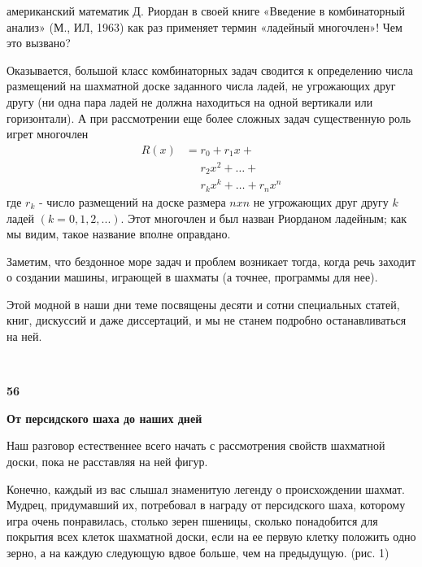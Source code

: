 \begin{multicols}{3}
\RaggedRight
\setlength{\parskip}{0pt}
\setlength{\parindent}{0pt}
американский математик Д. Риордан в своей книге
«Введение в комбинаторный анализ» (М., ИЛ, 1963) как раз 
применяет термин «ладейный многочлен»! Чем это вызвано?

\setlength{\parindent}{17pt} 
Оказывается, большой класс комбинаторных задач сводится к определению
числа размещений на шахматной доске заданного числа ладей,
не угрожающих друг другу (ни одна пара ладей не должна
находиться на одной вертикали или горизонтали). А при
рассмотрении еще более сложных задач существенную роль игрет
многочлен 
{\setlength{\abovedisplayskip}{6pt}
\setlength{\belowdisplayskip}{6pt}
\[
\begin{aligned}
    R(x) &= r_0 + r_1x + \\
         &\phantom{=} r_2x^2 + \dots + \\
         &\phantom{=} r_kx^k + \dots + r_nx^n
\end{aligned}
\]} где \(r_k\) - число размещений на доске размера \(nxn\) не угрожающих друг другу \(k\)
ладей \((k = 0,1,2,...)\). Этот многочлен и был назван Риорданом ладейным; как мы видим,
такое название вполне оправдано.

Заметим, что бездонное море задач и проблем возникает тогда, когда речь заходит о
создании машины, играющей в шахматы (а точнее, программы для нее).

Этой модной в наши дни теме посвящены десяти и сотни специальных статей, книг, дискуссий и даже диссертаций, и мы не станем подробно останавливаться на ней.


\quad \\

\begin{flushleft}
\textbf{56}    
\end{flushleft}


\columnbreak


\begin{center}
  \textbf{От персидского шаха до наших дней}
\end{center} 

Наш разговор естественнее всего начать с рассмотрения свойств шахматной доски,
пока не расставляя на ней фигур.

Конечно, каждый из вас слышал знаменитую легенду о происхождении шахмат. Мудрец, придумавший их, потребовал в награду от персидского шаха, которому игра очень понравилась, столько зерен пшеницы, сколько понадобится для покрытия всех клеток шахматной доски, если на ее первую клетку положить одно зерно, а на каждую следующую вдвое больше, чем на предыдущую. (рис. 1)


\end{multicols}
